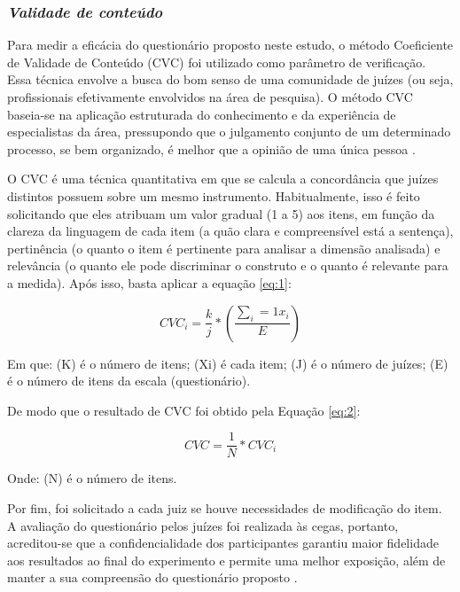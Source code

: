 \subsubsection*{\textit{Validade de conteúdo}}

Para medir a eficácia do questionário proposto neste estudo, o método Coeficiente de Validade de Conteúdo (CVC) foi utilizado como parâmetro de verificação. Essa técnica envolve a busca do bom senso de uma comunidade de juízes (ou seja, profissionais efetivamente envolvidos na área de pesquisa). O método CVC baseia-se na aplicação estruturada do conhecimento e da experiência de especialistas da área, pressupondo que o julgamento conjunto de um determinado processo, se bem organizado, é melhor que a opinião de uma única pessoa \cite{Santos2018,Gurgel2021}.

O CVC é uma técnica quantitativa em que se calcula a concordância que juízes distintos possuem sobre um mesmo instrumento. Habitualmente, isso é feito solicitando que eles atribuam um valor gradual (1 a 5) aos itens, em função da clareza da linguagem de cada item (a quão clara e compreensível está a sentença), pertinência (o quanto o item é pertinente para analisar a dimensão analisada) e relevância (o quanto ele pode discriminar o construto e o quanto é relevante para a medida).  Após isso, basta aplicar a equação \ref{eq:1}:

\begin{equation}
CVC_{i}=\frac{k}{j}*\left (\frac{\sum_{i}=1x_{i}}{E}\right)
\label{eq:1}
\end{equation}

Em que: (K) é o número de itens; (Xi) é cada item; (J) é o número de juízes; (E) é o número de itens da escala (questionário).

De modo que o resultado de CVC foi obtido pela Equação \ref{eq:2}:

\begin{equation}
CVC=\frac{1}{N}*CVC_{i}
\label{eq:2} 
\end{equation}

Onde: (N) é o número de itens.

Por fim, foi solicitado a cada juiz se houve necessidades de modificação do item. A avaliação do questionário pelos juízes foi realizada às cegas, portanto, acreditou-se que a confidencialidade dos participantes garantiu maior fidelidade aos resultados ao final do experimento e permite uma melhor exposição, além de manter a sua compreensão do questionário proposto \cite{Hasson2000}.

